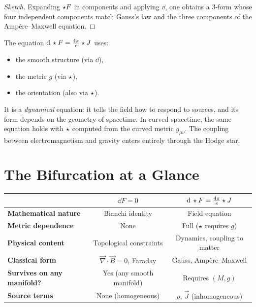 \begin{proof}[Sketch]
Expanding $\star F$ in components and applying $\dd$, one obtains a 3-form whose four independent components match Gauss's law and the three components of the Amp\`ere--Maxwell equation.
\end{proof}

\begin{remark}
The equation $\mathrm{d}\,\star F = \frac{4\pi}{c}\star J$ uses:
\begin{itemize}
\item the smooth structure (via $\dd$),
\item the metric $g$ (via $\star$),
\item the orientation (also via $\star$).
\end{itemize}
It is a \emph{dynamical} equation: it tells the field how to respond to sources, and its form depends on the geometry of spacetime. In curved spacetime, the same equation holds with $\star$ computed from the curved metric $g_{\mu\nu}$. The coupling between electromagnetism and gravity enters entirely through the Hodge star.
\end{remark}

\section{The Bifurcation at a Glance}

\begin{table}[h]
\centering
\renewcommand{\arraystretch}{1.6}
\begin{tabular}{lcc}
\toprule
& $\dd F = 0$ & $\mathrm{d}\,\star F = \frac{4\pi}{c}\star J$ \\
\midrule
\textbf{Mathematical nature} & Bianchi identity & Field equation \\
\textbf{Metric dependence} & None & Full ($\star$ requires $g$) \\
\textbf{Physical content} & Topological constraints & Dynamics, coupling to matter \\
\textbf{Classical form} & $\vec{\nabla}\cdot\vec{B}=0$, Faraday & Gauss, Amp\`ere--Maxwell \\
\textbf{Survives on any manifold?} & Yes (any smooth manifold) & Requires $(M, g)$ \\
\textbf{Source terms} & None (homogeneous) & $\rho$, $\vec{J}$ (inhomogeneous) \\
\bottomrule
\end{tabular}
\end{table}

